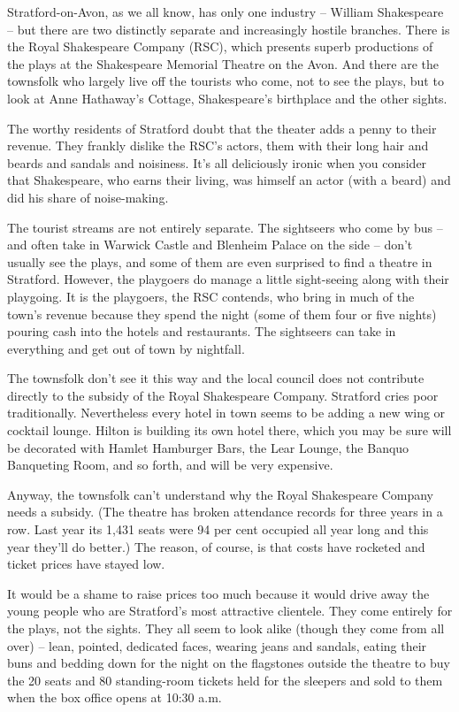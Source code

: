 Stratford-on-Avon, as we all know, has only one industry – William Shakespeare – but there are two distinctly separate and increasingly hostile branches. There is the Royal Shakespeare Company (RSC), which presents superb productions of the plays at the Shakespeare Memorial Theatre on the Avon. And there are the townsfolk who largely live off the tourists who come, not to see the plays, but to look at Anne Hathaway's Cottage, Shakespeare's birthplace and the other sights.


The worthy residents of Stratford doubt that the theater adds a penny to their revenue. They frankly dislike the RSC's actors, them with their long hair and beards and sandals and noisiness. It's all deliciously ironic when you consider that Shakespeare, who earns their living, was himself an actor (with a beard) and did his share of noise-making.


The tourist streams are not entirely separate. The sightseers who come by bus – and often take in Warwick Castle and Blenheim Palace on the side – don't usually see the plays, and some of them are even surprised to find a theatre in Stratford. However, the playgoers do manage a little sight-seeing along with their playgoing. It is the playgoers, the RSC contends, who bring in much of the town's revenue because they spend the night (some of them four or five nights) pouring cash into the hotels and restaurants. The sightseers can take in everything and get out of town by nightfall.


The townsfolk don't see it this way and the local council does not contribute directly to the subsidy of the Royal Shakespeare Company. Stratford cries poor traditionally. Nevertheless every hotel in town seems to be adding a new wing or cocktail lounge. Hilton is building its own hotel there, which you may be sure will be decorated with Hamlet Hamburger Bars, the Lear Lounge, the Banquo Banqueting Room, and so forth, and will be very expensive.


Anyway, the townsfolk can't understand why the Royal Shakespeare Company needs a subsidy. (The theatre has broken attendance records for three years in a row. Last year its 1,431 seats were 94 per cent occupied all year long and this year they'll do better.) The reason, of course, is that costs have rocketed and ticket prices have stayed low.


It would be a shame to raise prices too much because it would drive away the young people who are Stratford's most attractive clientele. They come entirely for the plays, not the sights. They all seem to look alike (though they come from all over) – lean, pointed, dedicated faces, wearing jeans and sandals, eating their buns and bedding down for the night on the flagstones outside the theatre to buy the 20 seats and 80 standing-room tickets held for the sleepers and sold to them when the box office opens at 10:30 a.m.